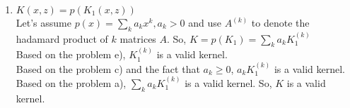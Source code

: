 \begin{answer}
\begin{enumerate}
\item $K(x,z) = p(K_1(x,z))$\\
Let's assume $p(x) = \sum\limits_k a_k x^k, a_k >0$ and use $A^{(k)}$ to denote the hadamard product of $k$ matrices $A$. So, $K = p(K_1) = \sum\limits_k a_k K_1^{(k)}$\\
Based on the problem e), $K_1^{(k)}$ is a valid kernel.\\
Based on the problem c) and the fact that $a_k \geq 0$, $a_k K_1^{(k)}$ is a valid kernel.\\
Based on the problem a), $\sum\limits_k a_k K_1^{(k)}$ is a valid kernel. So, $K$ is a valid kernel.
\end{enumerate}
\end{answer}